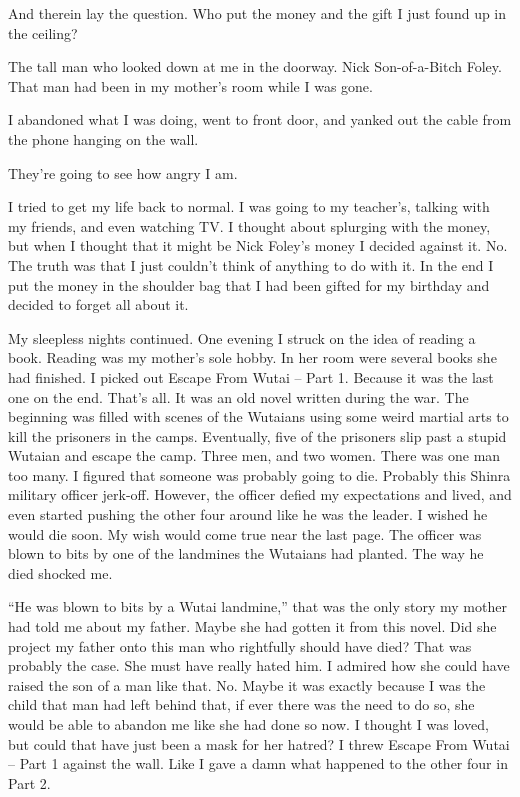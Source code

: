\documentclass[oneside]{book}
\begin{document}
And therein lay the question. Who put the money and the gift I just found up in the ceiling?

The tall man who looked down at me in the doorway. Nick Son-of-a-Bitch Foley. That man had been in my mother’s room while I was gone.

I abandoned what I was doing, went to front door, and yanked out the cable from the phone hanging on the wall.

They’re going to see how angry I am.

I tried to get my life back to normal. I was going to my teacher’s, talking with my friends, and even watching TV. I thought about splurging with the money, but when I thought that it might be Nick Foley’s money I decided against it. No. The truth was that I just couldn’t think of anything to do with it. In the end I put the money in the shoulder bag that I had been gifted for my birthday and decided to forget all about it.

My sleepless nights continued. One evening I struck on the idea of reading a book. Reading was my mother’s sole hobby. In her room were several books she had finished. I picked out Escape From Wutai – Part 1. Because it was the last one on the end. That’s all. It was an old novel written during the war. The beginning was filled with scenes of the Wutaians using some weird martial arts to kill the prisoners in the camps. Eventually, five of the prisoners slip past a stupid Wutaian and escape the camp. Three men, and two women. There was one man too many. I figured that someone was probably going to die. Probably this Shinra military officer jerk-off. However, the officer defied my expectations and lived, and even started pushing the other four around like he was the leader. I wished he would die soon. My wish would come true near the last page. The officer was blown to bits by one of the landmines the Wutaians had planted. The way he died shocked me.

“He was blown to bits by a Wutai landmine,” that was the only story my mother had told me about my father. Maybe she had gotten it from this novel. Did she project my father onto this man who rightfully should have died? That was probably the case. She must have really hated him. I admired how she could have raised the son of a man like that. No. Maybe it was exactly because I was the child that man had left behind that, if ever there was the need to do so, she would be able to abandon me like she had done so now. I thought I was loved, but could that have just been a mask for her hatred? I threw Escape From Wutai – Part 1 against the wall. Like I gave a damn what happened to the other four in Part 2.
\end{document}
